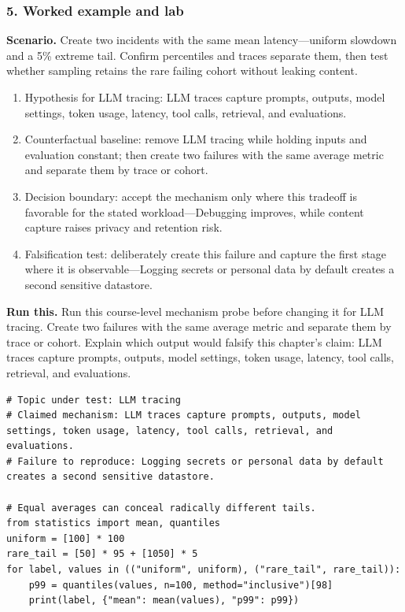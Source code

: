 \subsubsection*{5. Worked example and lab}
\textbf{Scenario.} Create two incidents with the same mean latency—uniform slowdown and a 5\% extreme tail. Confirm percentiles and traces separate them, then test whether sampling retains the rare failing cohort without leaking content.
\begin{enumerate}
\item Hypothesis for LLM tracing: LLM traces capture prompts, outputs, model settings, token usage, latency, tool calls, retrieval, and evaluations.
\item Counterfactual baseline: remove LLM tracing while holding inputs and evaluation constant; then create two failures with the same average metric and separate them by trace or cohort.
\item Decision boundary: accept the mechanism only where this tradeoff is favorable for the stated workload—Debugging improves, while content capture raises privacy and retention risk.
\item Falsification test: deliberately create this failure and capture the first stage where it is observable—Logging secrets or personal data by default creates a second sensitive datastore.
\end{enumerate}
\textbf{Run this.} Run this course-level mechanism probe before changing it for LLM tracing. Create two failures with the same average metric and separate them by trace or cohort. Explain which output would falsify this chapter's claim: LLM traces capture prompts, outputs, model settings, token usage, latency, tool calls, retrieval, and evaluations.
\begin{Verbatim}[fontsize=\scriptsize]
# Topic under test: LLM tracing
# Claimed mechanism: LLM traces capture prompts, outputs, model settings, token usage, latency, tool calls, retrieval, and evaluations.
# Failure to reproduce: Logging secrets or personal data by default creates a second sensitive datastore.

# Equal averages can conceal radically different tails.
from statistics import mean, quantiles
uniform = [100] * 100
rare_tail = [50] * 95 + [1050] * 5
for label, values in (("uniform", uniform), ("rare_tail", rare_tail)):
    p99 = quantiles(values, n=100, method="inclusive")[98]
    print(label, {"mean": mean(values), "p99": p99})
\end{Verbatim}
